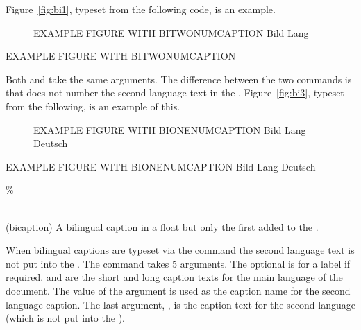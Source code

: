 Figure~\ref{fig:bi1}, typeset from the following code, is an example.
\begin{lcode}
\begin{figure}
\centering
EXAMPLE FIGURE WITH BITWONUMCAPTION
%
    {Bild}{  }{Lang } 
\end{figure}
\end{lcode}

 \begin{shadefigure}
 EXAMPLE FIGURE WITH BITWONUMCAPTION
 \end{shadefigure}

  Both \cmd{\bionenumcaption} and \cmd{\bitwonumcaption} take the same 
arguments.
The difference between the two commands is that \cmd{\bionenumcaption} does
not number the second language text in the \listofx.
Figure~\ref{fig:bi3}, typeset from the following, is an example of this.
\begin{lcode}
\begin{figure}
\centering
EXAMPLE FIGURE WITH BIONENUMCAPTION
%
    {Bild}{  }{Lang Deutsch } 
 \end{figure}
\end{lcode}

 \begin{shadefigure}
 EXAMPLE FIGURE WITH BIONENUMCAPTION
    {Bild}{  }{Lang Deutsch } 
 \end{shadefigure}

\begin{syntax}
\cmd{\bicaption}\% \\
                 \\
\end{syntax}
\glossary(bicaption)%
  {}%
  {A bilingual caption in a float but only the first added to the \listofx.}

When bilingual captions are typeset via the \cmd{\bicaption} 
command the second language text is not put into
the \listofx. 
The command takes 5 arguments. 
The optional  is for a label if required.
 and  are the short and long caption texts for
the main language of the document. The value of the  argument
is used as the caption name for the second language caption. The last
argument, , is the caption text
for the second language (which is not put into the \listofx). 

